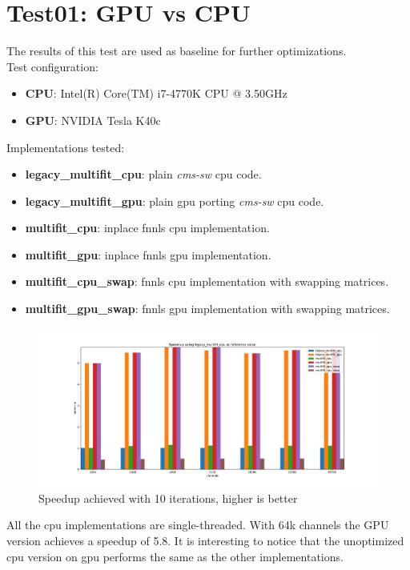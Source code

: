 \section{Test01: GPU vs CPU}
The results of this test are used as baseline for further optimizations. \\
Test configuration:
\begin{itemize}
  \item \textbf{CPU}: Intel(R) Core(TM) i7-4770K CPU @ 3.50GHz 
  \item \textbf{GPU}: NVIDIA Tesla K40c 
\end{itemize}
Implementations tested:
\begin{itemize}
  \item \textbf{legacy\_multifit\_cpu}: plain \textit{cms-sw} cpu code.
  \item \textbf{legacy\_multifit\_gpu}: plain gpu porting \textit{cms-sw} cpu code.
  \item \textbf{multifit\_cpu}: inplace fnnls cpu implementation.
  \item \textbf{multifit\_gpu}: inplace fnnls gpu implementation.
  \item \textbf{multifit\_cpu\_swap}: fnnls cpu implementation with swapping matrices.
  \item \textbf{multifit\_gpu\_swap}: fnnls gpu implementation with swapping matrices.
\end{itemize}
\begin{figure}[h]
  \includegraphics[width=\textwidth]{img/speedup}
  \caption{Speedup achieved with 10 iterations, higher is better}
  \label{img:speedup01}
\end{figure}
All the cpu implementations are single-threaded. With 64k channels the GPU version achieves a speedup of 5.8. It is interesting to notice that the unoptimized cpu version on gpu performs the same as the other implementations.
